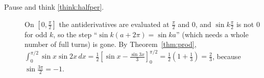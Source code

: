 \documentclass[11pt]{article}
\begin{document}
\begin{description}
  \item[Pause and think \ref{think:halfper}.] On $\left[0,\frac\pi2\right]$ the antiderivatives are evaluated at $\frac\pi2$ and $0$, and $\sin k\frac\pi2$ is not $0$ for odd $k$, so the step ``$\sin k(a+2\pi)=\sin ka$'' (which needs a whole number of full turns) is gone. By Theorem~\ref{thm:prod}, $\int_0^{\pi/2}\sin x\sin2x\,dx=\frac12\left[\sin x-\frac{\sin3x}3\right]_0^{\pi/2}=\frac12\left(1+\frac13\right)=\frac23$, because $\sin\frac{3\pi}2=-1$.
\end{description}
\end{document}
